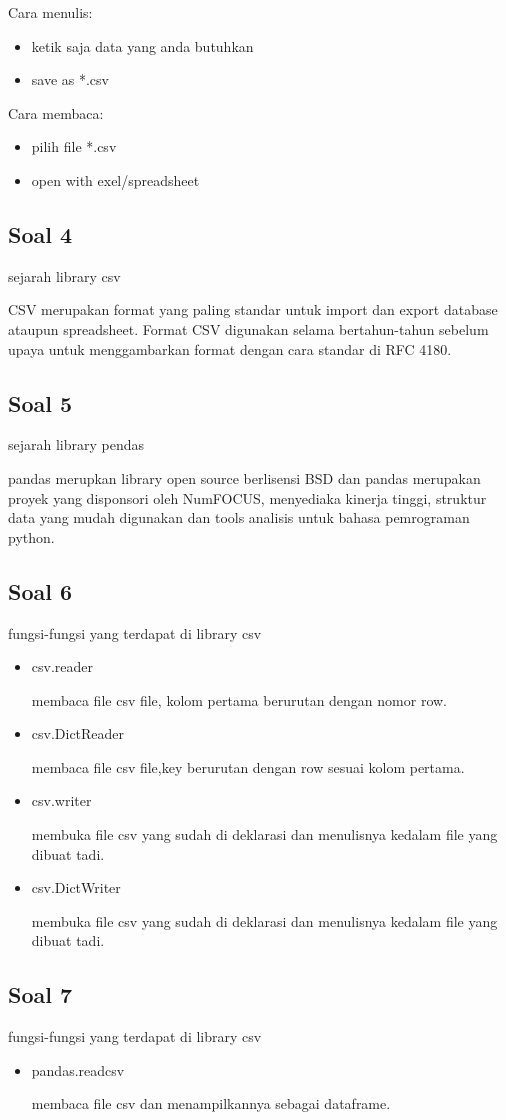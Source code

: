 Cara menulis:
\begin{itemize}
	\item ketik saja data yang anda butuhkan
	\item save as *.csv
\end{itemize}

Cara membaca:
\begin{itemize}
	\item pilih file *.csv
	\item open with exel/spreadsheet
\end{itemize}

\subsection{Soal 4}
sejarah library csv

CSV merupakan format yang paling standar untuk import dan export database ataupun spreadsheet. Format CSV digunakan selama bertahun-tahun sebelum upaya untuk menggambarkan format dengan cara standar di RFC 4180. 

\subsection{Soal 5}
sejarah library pendas

pandas merupkan library open source berlisensi BSD dan pandas merupakan proyek yang disponsori oleh NumFOCUS, menyediaka kinerja tinggi, struktur data yang mudah digunakan dan tools analisis untuk bahasa pemrograman python.  

\subsection{Soal 6}
fungsi-fungsi yang terdapat di library csv
\begin{itemize}
	\item csv.reader
	
	membaca file csv file, kolom pertama berurutan dengan nomor row. 
	
	\item csv.DictReader
	
	
	membaca file csv file,key berurutan dengan row sesuai kolom pertama.
		
	\item csv.writer
	
	membuka file csv yang sudah di deklarasi dan menulisnya kedalam file yang dibuat tadi.
		
	\item csv.DictWriter
	
	membuka file csv yang sudah di deklarasi dan menulisnya kedalam file yang dibuat tadi.	
	
\end{itemize}

\subsection{Soal 7}
fungsi-fungsi yang terdapat di library csv
\begin{itemize}

	\item pandas.read\textunderscore csv

	membaca file csv dan menampilkannya sebagai dataframe.
	
\end{itemize}


